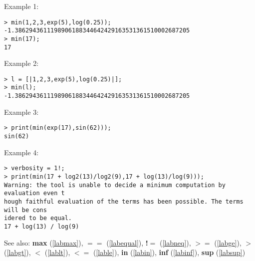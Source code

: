 \noindent Example 1: 
\begin{center}\begin{minipage}{15cm}\begin{Verbatim}[frame=single]
> min(1,2,3,exp(5),log(0.25));
-1.3862943611198906188344642429163531361510002687205
> min(17);
17
\end{Verbatim}
\end{minipage}\end{center}
\noindent Example 2: 
\begin{center}\begin{minipage}{15cm}\begin{Verbatim}[frame=single]
> l = [|1,2,3,exp(5),log(0.25)|];
> min(l);
-1.3862943611198906188344642429163531361510002687205
\end{Verbatim}
\end{minipage}\end{center}
\noindent Example 3: 
\begin{center}\begin{minipage}{15cm}\begin{Verbatim}[frame=single]
> print(min(exp(17),sin(62)));
sin(62)
\end{Verbatim}
\end{minipage}\end{center}
\noindent Example 4: 
\begin{center}\begin{minipage}{15cm}\begin{Verbatim}[frame=single]
> verbosity = 1!;
> print(min(17 + log2(13)/log2(9),17 + log(13)/log(9)));
Warning: the tool is unable to decide a minimum computation by evaluation even t
hough faithful evaluation of the terms has been possible. The terms will be cons
idered to be equal.
17 + log(13) / log(9)
\end{Verbatim}
\end{minipage}\end{center}
See also: \textbf{max} (\ref{labmax}), \textbf{$==$} (\ref{labequal}), \textbf{!$=$} (\ref{labneq}), \textbf{$>=$} (\ref{labge}), \textbf{$>$} (\ref{labgt}), \textbf{$<$} (\ref{lablt}), \textbf{$<=$} (\ref{lable}), \textbf{in} (\ref{labin}), \textbf{inf} (\ref{labinf}), \textbf{sup} (\ref{labsup})
